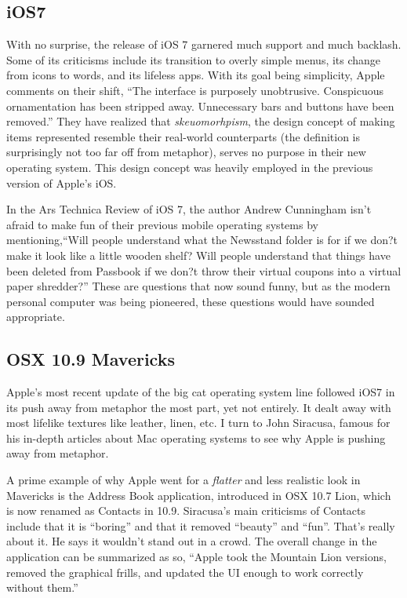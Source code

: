 \documentclass[11pt, oneside]{article}
\begin{document}
\subsection{iOS7}
With no surprise, the release of iOS 7 garnered much support and much backlash. Some of its criticisms include its transition to overly simple menus, its change from icons to words, and its lifeless apps. With its goal being simplicity, Apple comments on their shift, ``The interface is purposely unobtrusive. Conspicuous ornamentation has been stripped away. Unnecessary bars and buttons have been removed.'' \cite{apple-design} They have realized that \textit{skeuomorhpism}, the design concept of making items represented resemble their real-world counterparts (the definition is surprisingly not too far off from metaphor), serves no purpose in their new operating system. This design concept was heavily employed in the previous version of Apple's iOS.

In the Ars Technica Review of iOS 7, the author Andrew Cunningham isn't afraid to make fun of their previous mobile operating systems by mentioning,``Will people understand what the Newsstand folder is for if we don?t make it look like a little wooden shelf? Will people understand that things have been deleted from Passbook if we don?t throw their virtual coupons into a virtual paper shredder?'' \cite{ars-technica-iOS7} These are questions that now sound funny, but as the modern personal computer was being pioneered, these questions would have sounded appropriate.

\subsection{OSX 10.9 Mavericks}
Apple's most recent update of the big cat operating system line followed iOS7 in its push away from metaphor the most part, yet not entirely. It dealt away with most lifelike textures like leather, linen, etc. I turn to John Siracusa, famous for his in-depth articles about Mac operating systems to see why Apple is pushing away from metaphor.

A prime example of why Apple went for a \textit{flatter} and less realistic look in Mavericks is the Address Book application, introduced in OSX 10.7 Lion, which is now renamed as Contacts in 10.9. Siracusa's main criticisms of Contacts include that it is ``boring'' and that it removed ``beauty'' and ``fun''. That's really about it. He says it wouldn't stand out in a crowd. The overall change in the application can be summarized as so, ``Apple took the Mountain Lion versions, removed the graphical frills, and updated the UI enough to work correctly without them.'' \cite{ars-technica-mavericks} 
\end{document}
